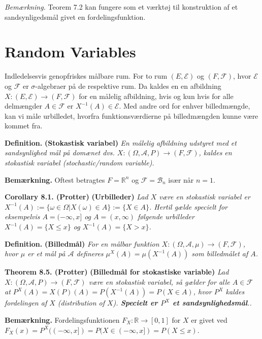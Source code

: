 \documentclass[
]{book}
\begin{document}
\emph{Bemærkning.} Teorem 7.2 kan fungere som et værktøj til konstruktion af et sandsynligedsmål givet en fordelingsfunktion.

\hypertarget{random-variables}{%
\section{Random Variables}\label{random-variables}}

Indledelsesvis genopfriskes målbare rum. For to rum \((E,\mathcal{E})\) og \((F,\mathcal{F})\), hvor \(\mathcal{E}\) og \(\mathcal{F}\) er \(\sigma\)-algebraer på de respektive rum. Da kaldes en en afbildning \(X : (E,\mathcal{E})\to(F,\mathcal{F})\) for en målelig afbildning, hvis og kun hvis for alle delmængder \(A\in\mathcal{F}\) er \(X^{-1}(A)\in\mathcal{E}\). Med andre ord for enhver billedmængde, kan vi måle urbilledet, hvorfra funktionsværdierne på billedmængden kunne være kommet fra.

\textbf{Definition.} \textbf{(Stokastisk variabel)} \emph{En målelig afbildning udstyret med et sandsynlighed mål på domænet dvs. \(X : (\Omega,\mathcal{A},P) \to (F,\mathcal{F})\), kaldes en stokastisk variabel (stochastic/random variable).}

\textbf{Bemærkning.} Oftest betragtes \(F=\mathbb{R}^n\) og \(\mathcal{F}=\mathcal{B}_n\) især når \(n=1\).

\textbf{Corollary 8.1. (Protter)} \textbf{(Urbilleder)} \emph{Lad \(X\) være en stokastisk variabel er \(X^{-1}(A):=\{\omega\in\Omega \vert X(\omega)\in A\}:=\{X\in A\}\). Hertil gælde specielt for eksempelvis \(A=(-\infty,x]\) og \(A=(x,\infty)\) følgende urbilleder \(X^{-1}(A)=\{X\le x\}\) og \(X^{-1}(A)=\{X> x\}\).}

\textbf{Definition.} \textbf{(Billedmål)} \emph{For en målbar funktion \(X : (\Omega,\mathcal{A},\mu) \to (F,\mathcal{F})\), hvor \(\mu\) er et mål på \(\mathcal{A}\) defineres \(\mu^X(A)=\mu(X^{-1}(A))\) som billedmålet af \(A\).}

\textbf{Theorem 8.5. (Protter)} \textbf{(Billedmål for stokastiske variable)} \emph{Lad \(X : (\Omega,\mathcal{A},P) \to (F,\mathcal{F})\) være en stokastisk variabel, så gælder for alle \(A\in\mathcal{F}\) at \(P^X(A)=X(P)(A)=P(X^{-1}(A))=P(X\in A)\), hvor \(P^X\) kaldes fordelingen af \(X\) (distribution of \(X\)). \textbf{Specielt er \(P^X\) et sandsynlighedsmål}..}

\textbf{Bemærkning.} Fordelingsfunktionen \(F_X: \mathbb{R}\to [0,1]\) for \(X\) er givet ved \(F_X(x)=P^X((-\infty,x])=P(X\in (-\infty,x])=P(X\le x)\).
\end{document}
